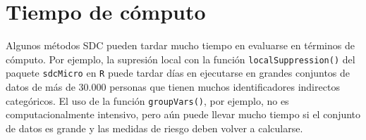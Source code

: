 \documentclass[]{book}
\newenvironment{Shaded}{\begin{snugshade}}{\end{snugshade}}
\newcommand{\CommentTok}[1]{\textcolor[rgb]{0.56,0.35,0.01}{\textit{#1}}}
\newcommand{\ControlFlowTok}[1]{\textcolor[rgb]{0.13,0.29,0.53}{\textbf{#1}}}
\newcommand{\DataTypeTok}[1]{\textcolor[rgb]{0.13,0.29,0.53}{#1}}
\newcommand{\DecValTok}[1]{\textcolor[rgb]{0.00,0.00,0.81}{#1}}
\newcommand{\KeywordTok}[1]{\textcolor[rgb]{0.13,0.29,0.53}{\textbf{#1}}}
\newcommand{\NormalTok}[1]{#1}
\newcommand{\OperatorTok}[1]{\textcolor[rgb]{0.81,0.36,0.00}{\textbf{#1}}}
\newcommand{\OtherTok}[1]{\textcolor[rgb]{0.56,0.35,0.01}{#1}}
\newcommand{\StringTok}[1]{\textcolor[rgb]{0.31,0.60,0.02}{#1}}
\theoremstyle{definition}
\theoremstyle{definition}
\theoremstyle{definition}
\theoremstyle{definition}
\theoremstyle{remark}
\begin{document}
\begin{Shaded}
\end{Shaded}

\hypertarget{tiempo-de-cuxf3mputo}{%
\section{Tiempo de cómputo}\label{tiempo-de-cuxf3mputo}}

Algunos métodos SDC pueden tardar mucho tiempo en evaluarse en términos de cómputo. Por ejemplo, la supresión local con la función \texttt{localSuppression()} del paquete \texttt{sdcMicro} en \texttt{R} puede tardar días en ejecutarse en grandes conjuntos de datos de más de 30.000 personas que tienen muchos identificadores indirectos categóricos. El uso de la función \texttt{groupVars()}, por ejemplo, no es computacionalmente intensivo, pero aún puede llevar mucho tiempo si el conjunto de datos es grande y las medidas de riesgo deben volver a calcularse.
\end{document}
